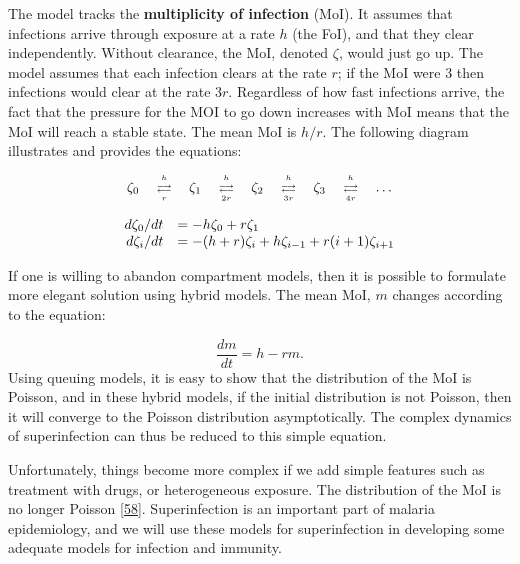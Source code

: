 \documentclass[
]{book}
\begin{document}
The model tracks the \textbf{multiplicity of infection} (MoI). It assumes that infections arrive through exposure at a rate \(h\) (the FoI), and that they clear independently. Without clearance, the MoI, denoted \(\zeta\), would just go up. The model assumes that each infection clears at the rate \(r\); if the MoI were \(3\) then infections would clear at the rate \(3r\). Regardless of how fast infections arrive, the fact that the pressure for the MOI to go down increases with MoI means that the MoI will reach a stable state. The mean MoI is \(h/r.\) The following diagram illustrates and provides the equations:

\begin{equation*}
\begin{array}{c}
%
\begin{array}{ccccccccc}
\zeta_0 &  {h\atop \longrightarrow} \atop {\longleftarrow \atop r} & \zeta_1  & {h\atop \longrightarrow} \atop {\longleftarrow \atop {2r}} & \zeta_2  & {h \atop \longrightarrow} \atop {\longleftarrow \atop {3r}} & \zeta_3  & {h \atop \longrightarrow} \atop {\longleftarrow \atop {4r}}& \ldots 
\end{array} 
\\ 
\\ 
\begin{array}{rl}
d\zeta_0/dt &= -h \zeta_0 + r \zeta_1 \\ 
d \zeta_i /dt &= -(h+r) \zeta_i + h \zeta_{i-1} + r(i+1) \zeta_{i+1} \\
\end{array} 
\end{array}
\end{equation*}

If one is willing to abandon compartment models, then it is possible to formulate more elegant solution using hybrid models. The mean MoI, \(m\) changes according to the equation:

\[\frac{dm}{dt} = h - r m.\]
Using queuing models, it is easy to show that the distribution of the MoI is Poisson, and in these hybrid models, if the initial distribution is not Poisson, then it will converge to the Poisson distribution asymptotically. The complex dynamics of superinfection can thus be reduced to this simple equation.

Unfortunately, things become more complex if we add simple features such as treatment with drugs, or heterogeneous exposure. The distribution of the MoI is no longer Poisson {[}\protect\hyperlink{ref-HenryJM2020HybridModel}{58}{]}. Superinfection is an important part of malaria epidemiology, and we will use these models for superinfection in developing some adequate models for infection and immunity.
\end{document}
